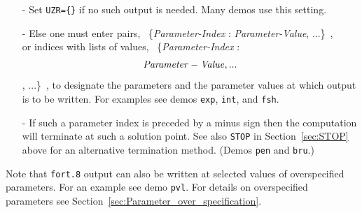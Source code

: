 \documentclass[12pt]{report}
\begin{document}
\begin{itemize}
\item[-]
 Set {\tt UZR=\{\}} if no such output is needed. Many demos use this setting.
\item[-]
 Else one must enter pairs,
            ~\{{\it Parameter-Index} : {\it Parameter-Value}, ...\}~,\\
 or indices with lists of values,
            ~\{{\it Parameter-Index} : \[{\it Parameter-Value}, ...\], ...\}~,
 to designate the parameters and the parameter
 values at which output is to be written.
 For examples see demos {\tt exp}, {\tt int}, and {\tt fsh}.
\item[-]
 If such a parameter index is preceded by a minus sign then the computation will
 terminate at such a solution point. See also \texttt{STOP} in
 Section~\ref{sec:STOP} above for an alternative termination method.
 (Demos {\tt pen} and {\tt bru}.)
\end{itemize}

Note that {\tt fort.8} output can also be written at selected values of 
overspecified parameters. For an example see demo {\tt pvl}.
For details on overspecified parameters see 
Section~\ref{sec:Parameter_over_specification}.
\end{document}
